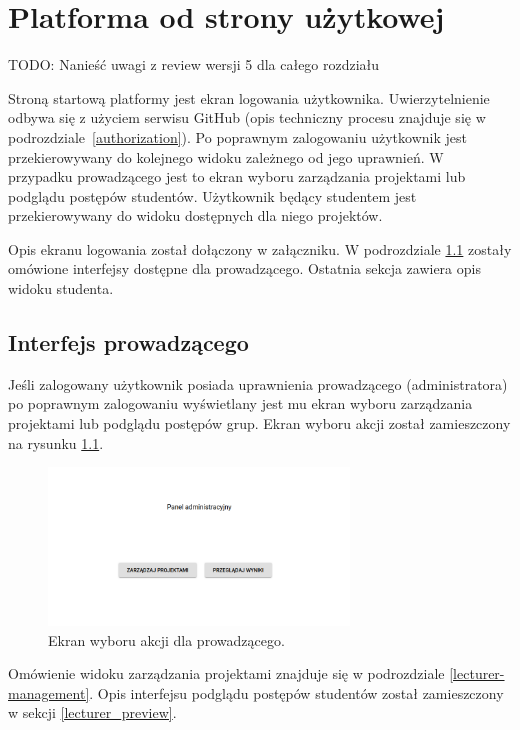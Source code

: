 \chapter{Platforma od strony użytkowej}
\label{chapter:interfaces}

TODO: Nanieść uwagi z review wersji 5 dla całego rozdziału

Stroną startową platformy jest ekran logowania użytkownika.
Uwierzytelnienie odbywa się z użyciem serwisu GitHub (opis techniczny procesu znajduje się w podrozdziale~\ref{authorization}).
Po poprawnym zalogowaniu użytkownik jest przekierowywany do kolejnego widoku zależnego od jego uprawnień.
W przypadku prowadzącego jest to ekran wyboru zarządzania projektami lub podglądu postępów studentów.
Użytkownik będący studentem jest przekierowywany do widoku dostępnych dla niego projektów.

Opis ekranu logowania został dołączony w załączniku.
W podrozdziale \ref{lecturer_ui} zostały omówione interfejsy dostępne dla prowadzącego.
Ostatnia sekcja zawiera opis widoku studenta.


\section{Interfejs prowadzącego}
\label{lecturer_ui}

Jeśli zalogowany użytkownik posiada uprawnienia prowadzącego (administratora) po poprawnym zalogowaniu wyświetlany jest mu ekran wyboru zarządzania projektami lub podglądu postępów grup.
Ekran wyboru akcji został zamieszczony na rysunku \ref{fig:lecturer_actions}.

\begin{figure}[h]
    \centering
    \includegraphics[width = 8cm]{chapter04/lecturer_actions.png}
    \caption{Ekran wyboru akcji dla prowadzącego.}
    \label{fig:lecturer_actions}
\end{figure}

Omówienie widoku zarządzania projektami znajduje się w podrozdziale \ref{lecturer-management}.
Opis interfejsu podglądu postępów studentów został zamieszczony w sekcji \ref{lecturer_preview}.

